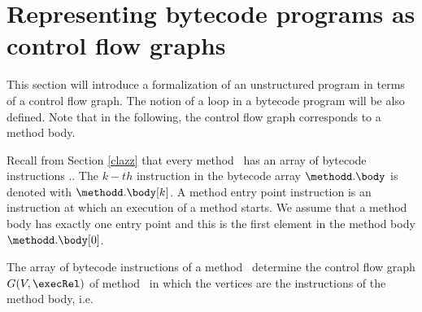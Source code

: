 \newtheorem{defEdge}{Definition}[section]
\newtheorem{defLoop}[defEdge]{Definition}
\newtheorem{defInter}[defEdge]{Definition}

\newtheorem{defInv}[defEdge]{Definition}
\newtheorem{defModif}[defEdge]{Definition}

\newtheorem{propPath}{Lemma}[section]

\section{Representing bytecode programs as control flow graphs}\label{prelim}

This section will introduce a formalization of an unstructured program in terms of a control flow graph.
The notion of a loop in a bytecode program will be also defined. Note that in the following,
the control flow graph corresponds to a method body. 


Recall from Section \ref{clazz} that every method \methodd \ has an array of bytecode instructions \methodd.\body.
The $k-th$ instruction in the bytecode array $\methodd.\body$ is  denoted with $\methodd.\body[k]$. A method entry point instruction is 
 an instruction at which an execution of a method starts.
 We assume that a method body has exactly one entry point
 and this is the first element in the method body $\methodd.\body[0]$.

 The array of bytecode instructions of a method \methodd \ determine the control flow graph $G( V , \execRel ) $  of method \methodd \ 
in which the vertices are the instructions of the method body, i.e. 

